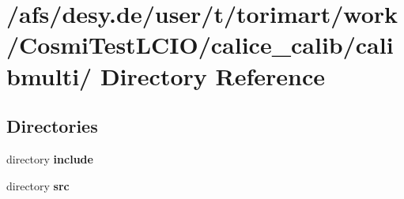 \section{/afs/desy.de/user/t/torimart/work/CosmiTestLCIO/calice\_\-calib/calibmulti/ Directory Reference}
\label{dir_793ca66ff6181fad75508c6272511847}
\subsection*{Directories}
\begin{DoxyCompactItemize}
\item 
directory {\bf include}
\item 
directory {\bf src}
\end{DoxyCompactItemize}
